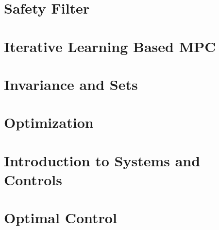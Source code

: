 \documentclass[layout=summary, columns=4,secnumdepth=2,tight]{sst-custom}
\begin{document}
  \section{Safety Filter}
  
  \section{Iterative Learning Based MPC}
  
  \section{Invariance and Sets}
  
  \section{Optimization}
  
  
  \section{Introduction to Systems and Controls}
  
  \section{Optimal Control}
  
  \iftoggle{do-multicol}{
\end{multicols*}}{}
\end{document}
